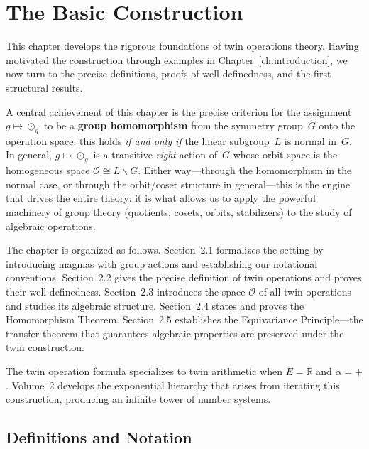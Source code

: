 \documentclass[11pt,a4paper,openany]{book}
\theoremstyle{plain}
\theoremstyle{definition}
\newcommand{\twing}[1]{\odot_{#1}}
\newcommand{\opspace}{\mathcal{O}}
\newcommand{\lingroup}{L}
\newcommand{\actspace}{E}
\newcommand{\groupG}{G}
\begin{document}
\chapter{The Basic Construction}
\label{ch:construction}

This chapter develops the rigorous foundations of twin operations theory. Having motivated the construction through examples in Chapter~\ref{ch:introduction}, we now turn to the precise definitions, proofs of well-definedness, and the first structural results.

A central achievement of this chapter is the precise criterion for the assignment $g \mapsto \twing{g}$ to be a \textbf{group homomorphism} from the symmetry group~$\groupG$ onto the operation space: this holds \emph{if and only if} the linear subgroup~$\lingroup$ is normal in~$\groupG$. In general, $g \mapsto \twing{g}$ is a transitive \emph{right} action of~$\groupG$ whose orbit space is the homogeneous space $\opspace \cong \lingroup\backslash\groupG$. Either way---through the homomorphism in the normal case, or through the orbit/coset structure in general---this is the engine that drives the entire theory: it is what allows us to apply the powerful machinery of group theory (quotients, cosets, orbits, stabilizers) to the study of algebraic operations.

The chapter is organized as follows. Section~2.1 formalizes the setting by introducing magmas with group actions and establishing our notational conventions. Section~2.2 gives the precise definition of twin operations and proves their well-definedness. Section~2.3 introduces the space $\opspace$ of all twin operations and studies its algebraic structure. Section~2.4 states and proves the Homomorphism Theorem. Section~2.5 establishes the Equivariance Principle---the transfer theorem that guarantees algebraic properties are preserved under the twin construction.

\begin{connectionbox}
The twin operation formula specializes to twin arithmetic when $\actspace = \mathbb{R}$ and $\alpha = +$. Volume~2 develops the exponential hierarchy that arises from iterating this construction, producing an infinite tower of number systems.
\end{connectionbox}

\section{Definitions and Notation}
\end{document}
